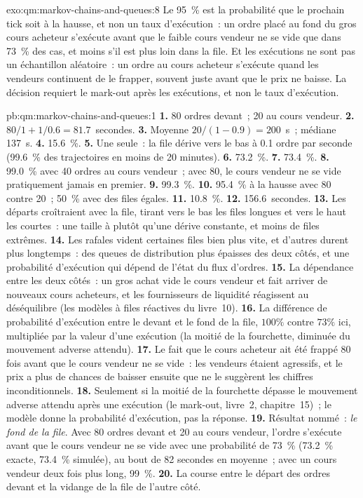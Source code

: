 \begin{solution}{exo:qm:markov-chains-and-queues:8}
Le 95~\% est la probabilité que le prochain tick soit à la hausse, et non un taux d'exécution~: un ordre placé au fond du gros cours acheteur s'exécute
avant que le faible cours vendeur ne se vide que dans 73~\% des cas, et moins s'il est plus loin dans la file. Et les exécutions ne sont pas un
échantillon aléatoire~: un ordre au cours acheteur s'exécute quand les vendeurs continuent de le frapper, souvent juste avant que le prix ne baisse. La
décision requiert le mark-out après les exécutions, et non le taux d'exécution.
\end{solution}

\begin{solution}{pb:qm:markov-chains-and-queues:1}
\textbf{1.} 80 ordres devant~; 20 au cours vendeur.
\textbf{2.} $80/1 + 1/0.6 = 81.7$~secondes.
\textbf{3.} Moyenne $20/(1 - 0.9) = 200$~s~; médiane 137~s.
\textbf{4.} 15.6~\%.
\textbf{5.} Une seule~: la file dérive vers le bas à 0.1 ordre par seconde (99.6~\% des trajectoires en moins de 20 minutes).
\textbf{6.} 73.2~\%.
\textbf{7.} 73.4~\%.
\textbf{8.} 99.0~\% avec 40 ordres au cours vendeur~; avec 80, le cours vendeur ne se vide pratiquement jamais en premier.
\textbf{9.} 99.3~\%.
\textbf{10.} 95.4~\% à la hausse avec 80 contre 20~; 50~\% avec des files égales.
\textbf{11.} 10.8~\%.
\textbf{12.} 156.6~secondes.
\textbf{13.} Les départs croîtraient avec la file, tirant vers le bas les files longues et vers le haut les courtes~: une taille à 
plutôt qu'une dérive constante, et moins de files extrêmes.
\textbf{14.} Les rafales vident certaines files bien plus vite, et d'autres durent plus longtemps~: des queues de distribution plus épaisses des deux côtés, et une probabilité
d'exécution qui dépend de l'état du flux d'ordres.
\textbf{15.} La dépendance entre les deux côtés~: un gros achat vide le cours vendeur et fait arriver de nouveaux cours acheteurs, et les fournisseurs de
liquidité réagissent au déséquilibre (les modèles à files réactives du livre~10).
\textbf{16.} La différence de probabilité d'exécution entre le devant et le fond de la file, $100\%$ contre $73\%$ ici, multipliée par la
valeur d'une exécution (la moitié de la fourchette, diminuée du mouvement adverse attendu).
\textbf{17.} Le fait que le cours acheteur ait été frappé 80 fois avant que le cours vendeur ne se vide~: les vendeurs étaient agressifs, et le prix a plus de chances
de baisser ensuite que ne le suggèrent les chiffres inconditionnels.
\textbf{18.} Seulement si la moitié de la fourchette dépasse le mouvement adverse attendu après une exécution (le mark-out, livre~2,
chapitre~15)~; le modèle donne la probabilité d'exécution, pas la réponse.
\textbf{19.} Résultat nommé~: \emph{le fond de la file}. Avec 80 ordres devant et 20 au cours vendeur, l'ordre s'exécute avant
que le cours vendeur ne se vide avec une probabilité de 73~\% (73.2~\% exacte, 73.4~\% simulée), au bout de 82 secondes en moyenne~; avec un
cours vendeur deux fois plus long, 99~\%.
\textbf{20.} La course entre le départ des ordres devant et la vidange de la file de l'autre côté.
\end{solution}

